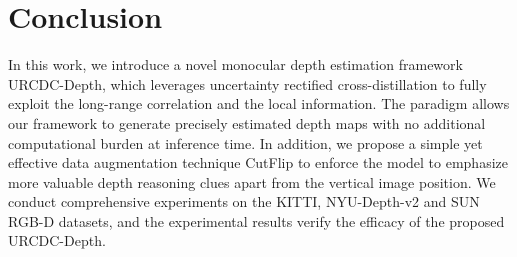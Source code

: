 \documentclass[letterpaper]{article} \usepackage{aaai23}  \usepackage{times}  \usepackage{helvet}  \usepackage{courier}  \usepackage[hyphens]{url}  \usepackage{graphicx} \urlstyle{rm} \def\UrlFont{\rm}  \usepackage{natbib}  \usepackage{caption} \frenchspacing  \setlength{\pdfpagewidth}{8.5in} \setlength{\pdfpageheight}{11in} \usepackage{algorithm}
\begin{document}
\section{Conclusion}
In this work, we introduce a novel monocular depth estimation framework URCDC-Depth, which leverages uncertainty rectified cross-distillation to fully exploit the long-range correlation and the local information. The paradigm allows our framework to generate precisely estimated depth maps with no additional computational burden at inference time. In addition, we propose a simple yet effective data augmentation technique CutFlip to enforce the model to emphasize more valuable depth reasoning clues apart from the vertical image position. We conduct comprehensive experiments on the KITTI, NYU-Depth-v2 and SUN RGB-D datasets, and the experimental results verify the efficacy of the proposed URCDC-Depth.


\normalem

\end{document}
